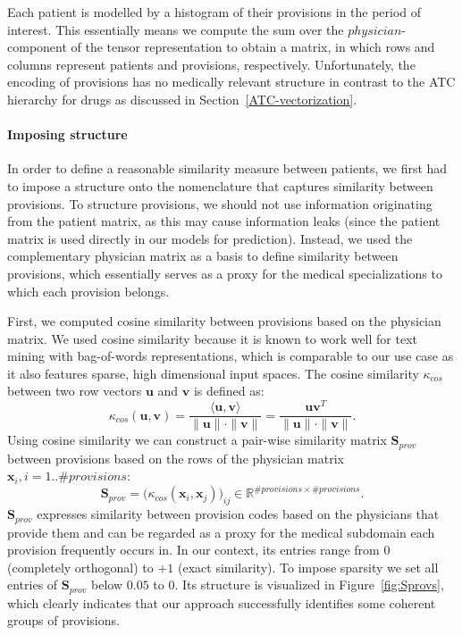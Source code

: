 Each patient is modelled by a histogram of their provisions in the period of interest. This essentially means we compute the sum over the $physician$-component of the tensor representation to obtain a matrix, in which rows and columns represent patients and provisions, respectively. Unfortunately, the encoding of provisions has no medically relevant structure in contrast to the ATC hierarchy for drugs as discussed in Section~\ref{ATC-vectorization}.

\paragraph{Imposing structure} In order to define a reasonable similarity measure between patients, we first had to impose a structure onto the nomenclature that captures similarity between provisions. To structure provisions, we should not use information originating from the patient matrix, as this may cause information leaks (since the patient matrix is used directly in our models for prediction). Instead, we used the complementary physician matrix as a basis to define similarity between provisions, which essentially serves as a proxy for the medical specializations to which each provision belongs. 

First, we computed cosine similarity between provisions based on the physician matrix. We used cosine similarity because it is known to work well for text mining with bag-of-words representations, which is comparable to our use case as it also features sparse, high dimensional input spaces. The cosine similarity $\kappa_{cos}$ between two row vectors $\mathbf{u}$ and $\mathbf{v}$ is defined as:
\begin{equation}
\kappa_{cos}(\mathbf{u}, \mathbf{v}) = \frac{\langle \mathbf{u}, \mathbf{v} \rangle}{\|\mathbf{u}\| \cdot \|\mathbf{v}\|} = \frac{\mathbf{u}\mathbf{v}^T}{\|\mathbf{u}\| \cdot \|\mathbf{v}\|}.
\label{eq:cosine}
\end{equation}
Using cosine similarity we can construct a pair-wise similarity matrix $\mathbf{S}_{prov}$ between provisions based on the rows of the physician matrix $\mathbf{x}_i, i=1..\# provisions$:
\begin{equation}
\mathbf{S}_{prov} = \big(\kappa_{cos}(\mathbf{x}_i,\mathbf{x}_j)\big)_{ij} \in \mathbb{R}^{\# provisions \times \# provisions}.
\label{eq:cosine-kernel}
\end{equation}
$\mathbf{S}_{prov}$ expresses similarity between provision codes based on the physicians that provide them and can be regarded as a proxy for the medical subdomain each provision frequently occurs in. In our context, its entries range from $0$ (completely orthogonal) to $+1$ (exact similarity). To impose sparsity we set all entries of $\mathbf{S}_{prov}$ below $0.05$ to $0$. Its structure is visualized in Figure~\ref{fig:Sprovs}, which clearly indicates that our approach successfully identifies some coherent groups of provisions.

